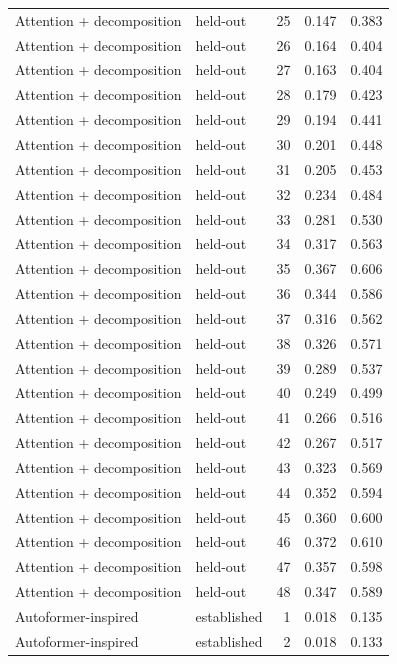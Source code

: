 \begin{tabular}{llrrr}
Attention + decomposition & held-out & 25 & 0.147 & 0.383 \\
Attention + decomposition & held-out & 26 & 0.164 & 0.404 \\
Attention + decomposition & held-out & 27 & 0.163 & 0.404 \\
Attention + decomposition & held-out & 28 & 0.179 & 0.423 \\
Attention + decomposition & held-out & 29 & 0.194 & 0.441 \\
Attention + decomposition & held-out & 30 & 0.201 & 0.448 \\
Attention + decomposition & held-out & 31 & 0.205 & 0.453 \\
Attention + decomposition & held-out & 32 & 0.234 & 0.484 \\
Attention + decomposition & held-out & 33 & 0.281 & 0.530 \\
Attention + decomposition & held-out & 34 & 0.317 & 0.563 \\
Attention + decomposition & held-out & 35 & 0.367 & 0.606 \\
Attention + decomposition & held-out & 36 & 0.344 & 0.586 \\
Attention + decomposition & held-out & 37 & 0.316 & 0.562 \\
Attention + decomposition & held-out & 38 & 0.326 & 0.571 \\
Attention + decomposition & held-out & 39 & 0.289 & 0.537 \\
Attention + decomposition & held-out & 40 & 0.249 & 0.499 \\
Attention + decomposition & held-out & 41 & 0.266 & 0.516 \\
Attention + decomposition & held-out & 42 & 0.267 & 0.517 \\
Attention + decomposition & held-out & 43 & 0.323 & 0.569 \\
Attention + decomposition & held-out & 44 & 0.352 & 0.594 \\
Attention + decomposition & held-out & 45 & 0.360 & 0.600 \\
Attention + decomposition & held-out & 46 & 0.372 & 0.610 \\
Attention + decomposition & held-out & 47 & 0.357 & 0.598 \\
Attention + decomposition & held-out & 48 & 0.347 & 0.589 \\
Autoformer-inspired & established & 1 & 0.018 & 0.135 \\
Autoformer-inspired & established & 2 & 0.018 & 0.133 \\

\end{tabular}

